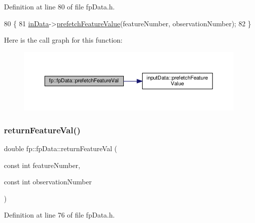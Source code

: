 Definition at line 80 of file fp\+Data.\+h.


\begin{DoxyCode}
80                                                                                     \{
81                 \hyperlink{classfp_1_1fpData_a49d7c3f58bcf88843c25b1b0c9714ebe}{inData}->\hyperlink{classinputData_af1637032057ee7aa01a19bd8d7583a95}{prefetchFeatureValue}(featureNumber, observationNumber);
82             \}
\end{DoxyCode}
Here is the call graph for this function\+:\nopagebreak
\begin{figure}[H]
\begin{center}
\leavevmode
\includegraphics[width=350pt]{classfp_1_1fpData_a3f9645ca93e9b64a788b3042e9e41fcc_cgraph}
\end{center}
\end{figure}
\mbox{\label{classfp_1_1fpData_a6b359086ec1e5c534095600e2ed5575f}} 
\subsubsection{\texorpdfstring{return\+Feature\+Val()}{returnFeatureVal()}}
{\footnotesize\ttfamily double fp\+::fp\+Data\+::return\+Feature\+Val (\begin{DoxyParamCaption}\item[{const int}]{feature\+Number,  }\item[{const int}]{observation\+Number }\end{DoxyParamCaption})\hspace{0.3cm}{\ttfamily [inline]}}



Definition at line 76 of file fp\+Data.\+h.


